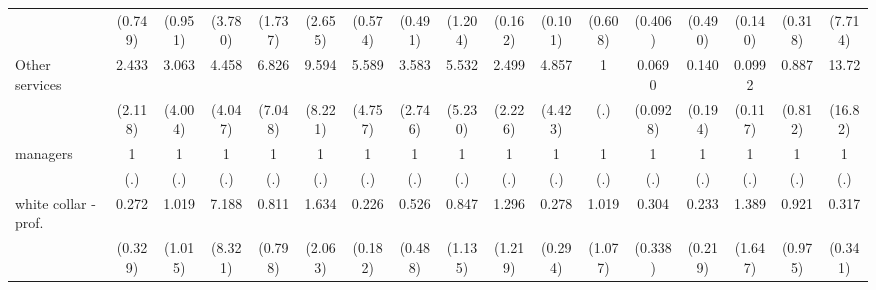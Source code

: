 {\begin{tabular}{l*{16}{c}}
                    &     (0.749)         &     (0.951)         &     (3.780)         &     (1.737)         &     (2.655)         &     (0.574)         &     (0.491)         &     (1.204)         &     (0.162)         &     (0.101)         &     (0.608)         &     (0.406)         &     (0.490)         &     (0.140)         &     (0.318)         &     (7.714)         \\
[1em]
Other services      &       2.433         &       3.063         &       4.458         &       6.826         &       9.594\sym{**} &       5.589\sym{*}  &       3.583         &       5.532         &       2.499         &       4.857         &           1         &      0.0690\sym{*}  &       0.140         &      0.0992         &       0.887         &       13.72\sym{*}  \\
                    &     (2.118)         &     (4.004)         &     (4.047)         &     (7.048)         &     (8.221)         &     (4.757)         &     (2.746)         &     (5.230)         &     (2.226)         &     (4.423)         &         (.)         &    (0.0928)         &     (0.194)         &     (0.117)         &     (0.812)         &     (16.82)         \\
[1em]
managers            &           1         &           1         &           1         &           1         &           1         &           1         &           1         &           1         &           1         &           1         &           1         &           1         &           1         &           1         &           1         &           1         \\
                    &         (.)         &         (.)         &         (.)         &         (.)         &         (.)         &         (.)         &         (.)         &         (.)         &         (.)         &         (.)         &         (.)         &         (.)         &         (.)         &         (.)         &         (.)         &         (.)         \\
[1em]
white collar - prof.&       0.272         &       1.019         &       7.188         &       0.811         &       1.634         &       0.226         &       0.526         &       0.847         &       1.296         &       0.278         &       1.019         &       0.304         &       0.233         &       1.389         &       0.921         &       0.317         \\
                    &     (0.329)         &     (1.015)         &     (8.321)         &     (0.798)         &     (2.063)         &     (0.182)         &     (0.488)         &     (1.135)         &     (1.219)         &     (0.294)         &     (1.077)         &     (0.338)         &     (0.219)         &     (1.647)         &     (0.975)         &     (0.341)         \\

\end{tabular}}
